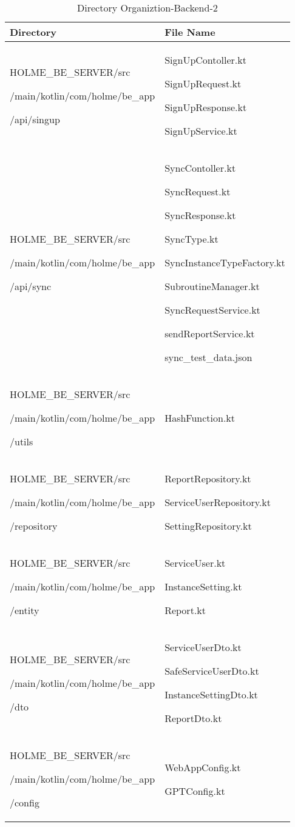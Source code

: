 \documentclass[conference]{IEEEtran}
\begin{document}
\begin{table}[h]
\caption{Directory Organiztion-Backend-2}
\def\arraystretch{1.24} \small
    \begin{tabular}{|p{3.9cm}|p{3.9cm}|}
        \hline
        Directory & File Name \\ \hline
          HOLME\_BE\_SERVER/src\par/main/kotlin/com/holme/be\_app\par/api/singup & SignUpContoller.kt \par SignUpRequest.kt \par SignUpResponse.kt \par SignUpService.kt\\ \hline
          HOLME\_BE\_SERVER/src\par/main/kotlin/com/holme/be\_app\par/api/sync & SyncContoller.kt \par SyncRequest.kt \par SyncResponse.kt \par SyncType.kt \par SyncInstanceTypeFactory.kt \par SubroutineManager.kt \par SyncRequestService.kt \par sendReportService.kt \par sync\_test\_data.json \\ \hline
          HOLME\_BE\_SERVER/src\par/main/kotlin/com/holme/be\_app\par/utils & HashFunction.kt \\ \hline
          HOLME\_BE\_SERVER/src\par/main/kotlin/com/holme/be\_app\par/repository & ReportRepository.kt\par ServiceUserRepository.kt \par SettingRepository.kt\\ \hline
          HOLME\_BE\_SERVER/src\par/main/kotlin/com/holme/be\_app\par/entity & ServiceUser.kt\par InstanceSetting.kt \par Report.kt\\ \hline
          HOLME\_BE\_SERVER/src\par/main/kotlin/com/holme/be\_app\par/dto & ServiceUserDto.kt\par SafeServiceUserDto.kt \par InstanceSettingDto.kt\par ReportDto.kt\\ \hline
          HOLME\_BE\_SERVER/src\par/main/kotlin/com/holme/be\_app\par/config & WebAppConfig.kt\par GPTConfig.kt\\ \hline
	\end{tabular}
\end{table}
\end{document}

